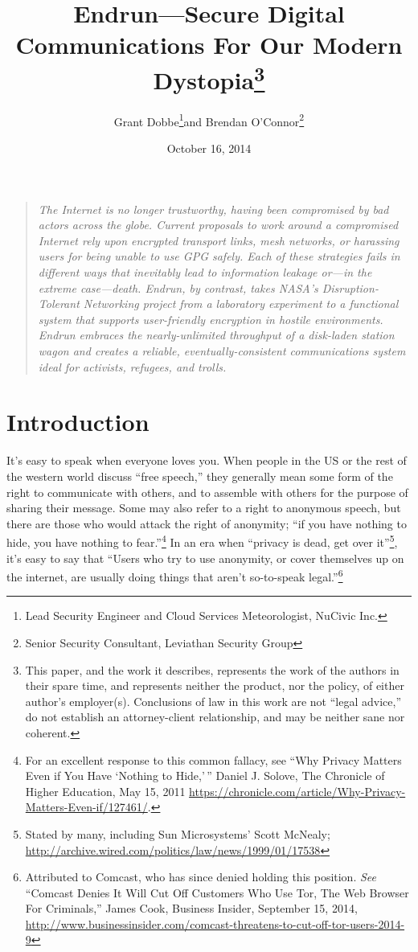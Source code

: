 \documentclass[12pt]{article}
\title{Endrun---Secure Digital Communications For Our Modern Dystopia\footnote{This paper, and the work it describes, represents the work of the authors in their spare time, and represents neither the product, nor the policy, of either author's employer(s). Conclusions of law in this work are not ``legal advice,'' do not establish an attorney-client relationship, and may be neither sane nor coherent.}}
\author{Grant Dobbe\footnote{Lead Security Engineer and Cloud Services Meteorologist, NuCivic Inc.}\space\space and Brendan O'Connor\footnote{Senior Security Consultant, Leviathan Security Group}}
\date{October 16, 2014}
\begin{document}
	
	
	\maketitle
  
  \begin{quote}
    \emph{The Internet is no longer trustworthy, having been compromised by bad actors across the globe. Current proposals to work around a compromised Internet rely upon encrypted transport links, mesh networks, or harassing users for being unable to use GPG safely. Each of these strategies fails in different ways that inevitably lead to information leakage or---in the extreme case---death. Endrun, by contrast, takes NASA's Disruption-Tolerant Networking project from a laboratory experiment to a functional system that supports user-friendly encryption in hostile environments. Endrun embraces the nearly-unlimited throughput of a disk-laden station wagon and creates a reliable, eventually-consistent communications system ideal for activists, refugees, and trolls.}
    \end{quote}
	
	\section{Introduction}
	
  It's easy to speak when everyone loves you. When people in the US or the rest of the western world discuss ``free speech,'' they generally mean some form of the right to communicate with others, and to assemble with others for the purpose of sharing their message. Some may also refer to a right to anonymous speech, but there are those who would attack the right of anonymity; ``if you have nothing to hide, you have nothing to fear.''\footnote{For an excellent response to this common fallacy, see ``Why Privacy Matters Even if You Have `Nothing to Hide,'\,'' Daniel J. Solove, The Chronicle of Higher Education, May 15, 2011 \url{https://chronicle.com/article/Why-Privacy-Matters-Even-if/127461/}.} In an era when ``privacy is dead, get over it''\footnote{Stated by many, including Sun Microsystems' Scott McNealy; \url{http://archive.wired.com/politics/law/news/1999/01/17538}}, it's easy to say that ``Users who try to use anonymity, or cover themselves up on the internet, are usually doing things that aren’t so-to-speak legal.''\footnote{Attributed to Comcast, who has since denied holding this position. \emph{See} ``Comcast Denies It Will Cut Off Customers Who Use Tor, The Web Browser For Criminals,'' James Cook, Business Insider, September 15, 2014, \url{http://www.businessinsider.com/comcast-threatens-to-cut-off-tor-users-2014-9}}
  
\end{document}
